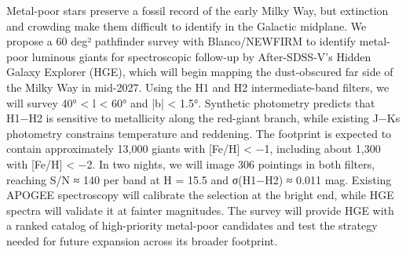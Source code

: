Metal-poor stars preserve a fossil record of the early Milky Way, but extinction and crowding make them difficult to identify in the Galactic midplane. We propose a 60 deg² pathfinder survey with Blanco/NEWFIRM to identify metal-poor luminous giants for spectroscopic follow-up by After-SDSS-V’s Hidden Galaxy Explorer (HGE), which will begin mapping the dust-obscured far side of the Milky Way in mid-2027. Using the H1 and H2 intermediate-band filters, we will survey 40° < l < 60° and |b| < 1.5°. Synthetic photometry predicts that H1−H2 is sensitive to metallicity along the red-giant branch, while existing J−Ks photometry constrains temperature and reddening. The footprint is expected to contain approximately 13,000 giants with [Fe/H] < −1, including about 1,300 with [Fe/H] < −2. In two nights, we will image 306 pointings in both filters, reaching S/N ≈ 140 per band at H = 15.5 and σ(H1−H2) ≈ 0.011 mag. Existing APOGEE spectroscopy will calibrate the selection at the bright end, while HGE spectra will validate it at fainter magnitudes. The survey will provide HGE with a ranked catalog of high-priority metal-poor candidates and test the strategy needed for future expansion across its broader footprint.